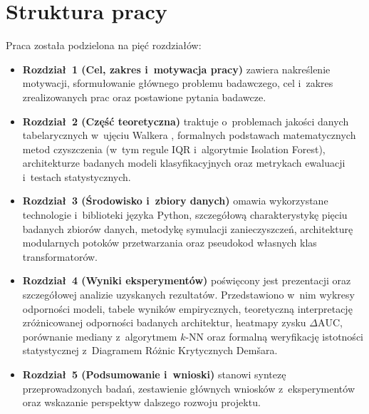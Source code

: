 \section{Struktura pracy}
Praca została podzielona na pięć rozdziałów:
\begin{itemize}
    \item \textbf{Rozdział~1 (Cel, zakres i~motywacja pracy)} zawiera nakreślenie motywacji, sformułowanie głównego problemu badawczego, cel i~zakres zrealizowanych prac oraz postawione pytania badawcze.
    \item \textbf{Rozdział~2 (Część teoretyczna)} traktuje o~problemach jakości danych tabelarycznych w~ujęciu Walkera \cite{Walker2021}, formalnych podstawach matematycznych metod czyszczenia (w~tym regule IQR i~algorytmie Isolation Forest), architekturze badanych modeli klasyfikacyjnych oraz metrykach ewaluacji i~testach statystycznych.
    \item \textbf{Rozdział~3 (Środowisko i~zbiory danych)} omawia wykorzystane technologie i~biblioteki języka Python, szczegółową charakterystykę pięciu badanych zbiorów danych, metodykę symulacji zanieczyszczeń, architekturę modularnych potoków przetwarzania oraz pseudokod własnych klas transformatorów.
    \item \textbf{Rozdział~4 (Wyniki eksperymentów)} poświęcony jest prezentacji oraz szczegółowej analizie uzyskanych rezultatów. Przedstawiono w~nim wykresy odporności modeli, tabele wyników empirycznych, teoretyczną interpretację zróżnicowanej odporności badanych architektur, heatmapy zysku $\Delta \mathrm{AUC}$, porównanie mediany z~algorytmem $k$-NN oraz formalną weryfikację istotności statystycznej z~Diagramem Różnic Krytycznych Demšara.
    \item \textbf{Rozdział~5 (Podsumowanie i~wnioski)} stanowi syntezę przeprowadzonych badań, zestawienie głównych wniosków z~eksperymentów oraz wskazanie perspektyw dalszego rozwoju projektu.
\end{itemize}
